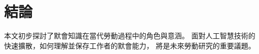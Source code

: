 \section{結論}

本文初步探討了默會知識在當代勞動過程中的角色與意涵。
面對人工智慧技術的快速擴散，如何理解並保存工作者的默會能力，
將是未來勞動研究的重要議題\parencite{lamTacitKnowledgeOrganizational2000,machacekWhitherHightechLabor2019}。
